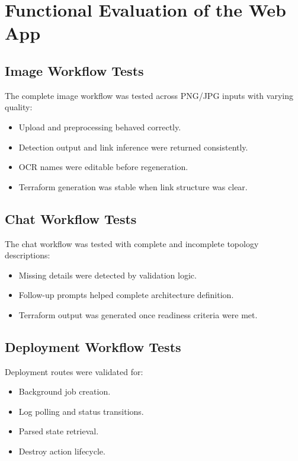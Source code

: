 \documentclass[12pt,a4paper,openany]{report}
\begin{document}
\section{Functional Evaluation of the Web App}

\subsection{Image Workflow Tests}

The complete image workflow was tested across PNG/JPG inputs with varying quality:
\begin{itemize}
    \item Upload and preprocessing behaved correctly.
    \item Detection output and link inference were returned consistently.
    \item OCR names were editable before regeneration.
    \item Terraform generation was stable when link structure was clear.
\end{itemize}

\subsection{Chat Workflow Tests}

The chat workflow was tested with complete and incomplete topology descriptions:
\begin{itemize}
    \item Missing details were detected by validation logic.
    \item Follow-up prompts helped complete architecture definition.
    \item Terraform output was generated once readiness criteria were met.
\end{itemize}

\subsection{Deployment Workflow Tests}

Deployment routes were validated for:
\begin{itemize}
    \item Background job creation.
    \item Log polling and status transitions.
    \item Parsed state retrieval.
    \item Destroy action lifecycle.
\end{itemize}
\end{document}
